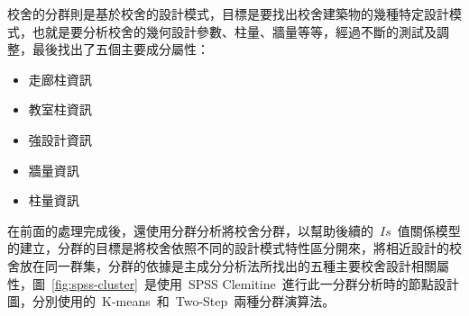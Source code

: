 
校舍的分群則是基於校舍的設計模式，目標是要找出校舍建築物的幾種特定設計模式，也就是要分析校舍的幾何設計參數、柱量、牆量等等，經過不斷的測試及調整，最後找出了五個主要成分屬性：

\begin{itemize}
\item 走廊柱資訊
\item 教室柱資訊
\item 強設計資訊
\item 牆量資訊
\item 柱量資訊
\end{itemize}


在前面的處理完成後，還使用分群分析將校舍分群，以幫助後續的~$Is$~值關係模型的建立，分群的目標是將校舍依照不同的設計模式特性區分開來，將相近設計的校舍放在同一群集，分群的依據是主成分分析法所找出的五種主要校舍設計相關屬性，圖~\ref{fig:spss-cluster}~是使用~SPSS Clemitine~進行此一分群分析時的節點設計圖，分別使用的~K-means~和~Two-Step~兩種分群演算法。


